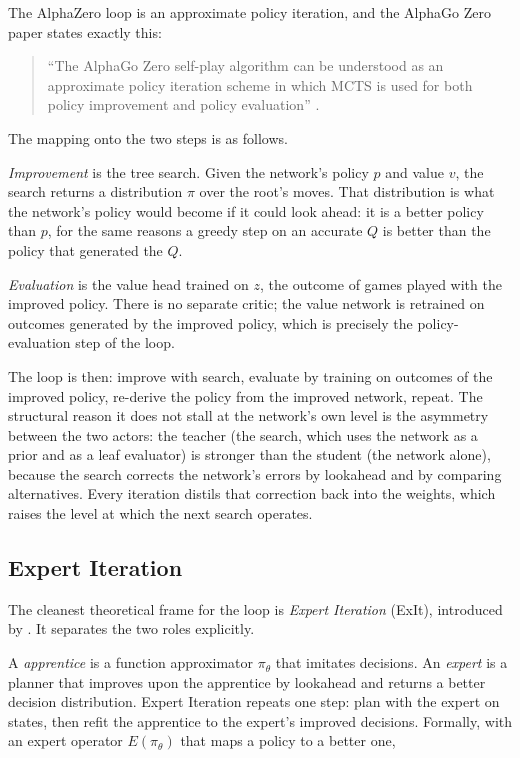 The AlphaZero loop is an approximate policy iteration, and the AlphaGo Zero
paper states exactly this:

\begin{quote}
``The AlphaGo Zero self-play algorithm can be understood as an approximate
policy iteration scheme in which MCTS is used for both policy improvement and
policy evaluation'' \citep{silver2017alphagozero}.
\end{quote}

The mapping onto the two steps is as follows.

\emph{Improvement} is the tree search. Given the network's policy $p$ and value
$v$, the search returns a distribution $\pi$ over the root's moves. That
distribution is what the network's policy would become if it could look ahead:
it is a better policy than $p$, for the same reasons a greedy step on an
accurate $Q$ is better than the policy that generated the $Q$.

\emph{Evaluation} is the value head trained on $z$, the outcome of games played
with the improved policy. There is no separate critic; the value network is
retrained on outcomes generated by the improved policy, which is precisely the
policy-evaluation step of the loop.

The loop is then: improve with search, evaluate by training on outcomes of the
improved policy, re-derive the policy from the improved network, repeat. The
structural reason it does not stall at the network's own level is the asymmetry
between the two actors: the teacher (the search, which uses the network as a
prior and as a leaf evaluator) is stronger than the student (the network alone),
because the search corrects the network's errors by lookahead and by comparing
alternatives. Every iteration distils that correction back into the weights,
which raises the level at which the next search operates.

\subsection{Expert Iteration}
\label{sec:exit}

The cleanest theoretical frame for the loop is \emph{Expert Iteration} (ExIt),
introduced by \citet{anthony2017exit}. It separates the two roles explicitly.

A \emph{apprentice} is a function approximator $\pi_\theta$ that imitates
decisions. An \emph{expert} is a planner that improves upon the apprentice by
lookahead and returns a better decision distribution. Expert Iteration repeats
one step: plan with the expert on states, then refit the apprentice to the
expert's improved decisions. Formally, with an expert operator
$E(\pi_\theta)$ that maps a policy to a better one,

